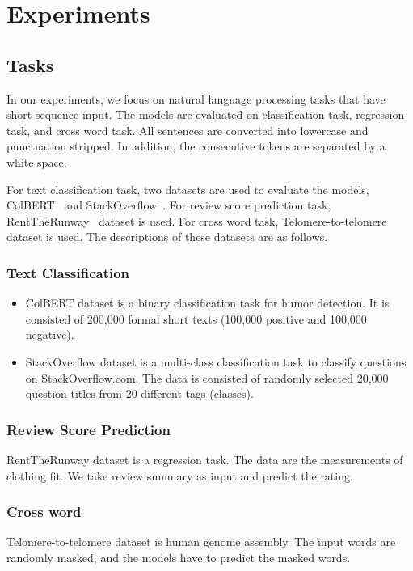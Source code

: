 \section{Experiments}

\subsection{Tasks}

In our experiments, we focus on natural language processing tasks that have short sequence input. The models are evaluated on classification task, regression task, and cross word task. All sentences are converted into lowercase and punctuation stripped. In addition, the consecutive tokens are separated by a white space. 

For text classification task, two datasets are used to evaluate the models, ColBERT~\cite{fw8e-z983-21} and StackOverflow~\cite{xu-etal-2015-short}. For review score prediction task, RentTheRunway~\cite{10.1145/3240323.3240398} dataset is used. For cross word task, Telomere-to-telomere~\cite{miga2020telomere} dataset is used. The descriptions of these datasets are as follows. %

\subsubsection{Text Classification}
\begin{itemize}
  \item ColBERT dataset is a binary classification task for humor detection. It is consisted of 200,000 formal short texts (100,000 positive and 100,000 negative).
  \item StackOverflow dataset is a multi-class classification task to classify questions on StackOverflow.com. The data is consisted of randomly selected 20,000 question titles from 20 different tags (classes).
\end{itemize}

\subsubsection{Review Score Prediction}
RentTheRunway dataset is a regression task. The data are the measurements of clothing fit. We take review summary as input and predict the rating.

\subsubsection{Cross word}
Telomere-to-telomere dataset is human genome assembly. The input words are randomly masked, and the models have to predict the masked words.


